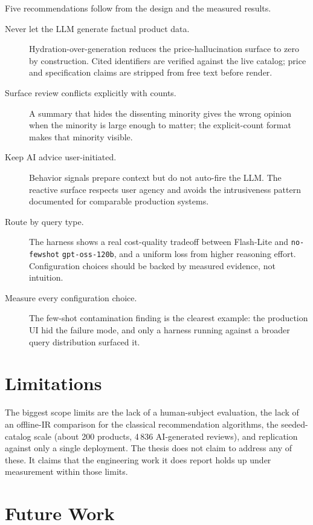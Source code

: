 Five recommendations follow from the design and the measured
results.

\begin{description}
  \item[Never let the LLM generate factual product data.]
    Hydration-over-generation reduces the price-hallucination
    surface to zero by construction. Cited identifiers are
    verified against the live catalog; price and specification
    claims are stripped from free text before render.
  \item[Surface review conflicts explicitly with counts.] A
    summary that hides the dissenting minority gives the
    wrong opinion when the minority is large enough to matter;
    the explicit-count format makes that minority visible.
  \item[Keep AI advice user-initiated.] Behavior signals prepare
    context but do not auto-fire the LLM. The reactive surface
    respects user agency and avoids the intrusiveness pattern
    documented for comparable production systems.
  \item[Route by query type.] The harness shows a real
    cost-quality tradeoff between Flash-Lite and
    \texttt{no-fewshot} \texttt{gpt-oss-120b}, and a uniform
    loss from higher reasoning effort. Configuration choices
    should be backed by measured evidence, not intuition.
  \item[Measure every configuration choice.] The few-shot
    contamination finding is the clearest example: the
    production UI hid the failure mode, and only a harness
    running against a broader query distribution surfaced it.
\end{description}

\section{Limitations}
\label{sec:concl-limitations}

The biggest scope limits are the lack of a human-subject
evaluation, the lack of an offline-IR comparison for the
classical recommendation algorithms, the seeded-catalog scale
(about 200 products, 4\,836 AI-generated reviews), and
replication against only a single deployment. The thesis does
not claim to address any of these. It claims that the
engineering work it does report holds up under measurement
within those limits.

\section{Future Work}
\label{sec:concl-future}

